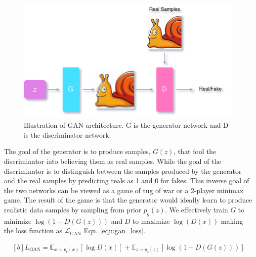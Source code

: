 \begin{figure}[h]
    \centering
    \includegraphics[scale=0.2]{figures/arch/gan_arch.png}
    \caption{Illustration of GAN architecture. G is the generator network and D is the discriminator network.}
    \label{fig:gan_arch}
\end{figure}

The goal of the generator is to produce samples, $G(z)$, that fool the discriminator into believing them as real samples. While the goal of the discriminator is to distinguish between the samples produced by the generator and the real samples by predicting reals as 1 and 0 for fakes. This inverse goal of the two networks can be viewed as a game of tug of war or a 2-player minimax game. The result of the game is that the generator would ideally learn to produce realistic data samples by sampling from prior $p_{g}(z)$. We effectively train $G$ to minimize $\log(1-D(G({z})))$ and $D$ to maximize $\log(D(x))$ making the loss function as $\mathcal{L}_{\mathrm{GAN}}$ Eqn. \ref{eqn:gan_loss}.

\begin{equation} \label{eqn:gan_loss}
    \begin{gathered}[b]
        {L}_{\mathrm{GAN}}=\mathbb{E}_{{x} \sim p_{r}(x)}[\log D({x})]+\mathbb{E}_{{z} \sim p_{z}(z)}[\log (1-D(G({z})))]
    \end{gathered}
\end{equation}

